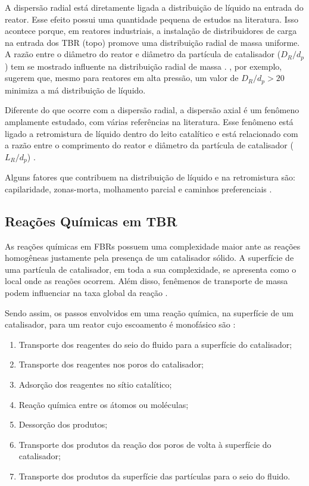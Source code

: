 A dispersão radial está diretamente ligada a distribuição de líquido na entrada
do reator. Esse efeito possui uma quantidade pequena de estudos na literatura.
Isso acontece porque, em reatores industriais, a instalação de distribuidores de
carga na entrada dos TBR (topo) promove uma distribuição radial de massa
uniforme. A razão entre o diâmetro do reator e diâmetro da partícula de
catalisador ($D_R/d_p$) tem se mostrado influente na distribuição radial de
massa \cite{Saroha1998}. , por exemplo, sugerem que,
mesmo para reatores em alta pressão, um valor de $D_R/d_p > 20$ minimiza a má
distribuição de líquido.

Diferente do que ocorre com a dispersão radial, a dispersão axial é um fenômeno
amplamente estudado, com várias referências na literatura. Esse fenômeno está
ligado a retromistura de líquido dentro do leito catalítico e está relacionado
com a razão entre o comprimento do reator e diâmetro da partícula de catalisador
($L_R/d_p$) \cite{Ancheyta2011}.


Alguns fatores que contribuem na distribuição de líquido e na retromistura são:
capilaridade, zonas-morta, molhamento parcial e caminhos preferenciais
\cite{Ranade2011}.

\subsection{Reações Químicas em TBR} \label{sec:reacoestbr}
 
As reações químicas em FBRs possuem uma complexidade maior ante as reações
homogêneas justamente pela presença de um catalisador sólido. A superfície
de uma partícula de catalisador, em toda a sua complexidade, se apresenta
como o local onde as reações ocorrem. Além disso, fenêmenos de transporte
de massa podem influenciar na taxa global da reação \cite{Froment2011}. 

Sendo assim, os passos envolvidos em uma reação química, na superfície de um
catalisador, para um reator cujo escoamento é monofásico são \cite{Froment2011}: 

\begin{enumerate}
\item Transporte dos reagentes do seio do fluido para a superfície
do catalisador;
\item Transporte dos reagentes nos poros do catalisador;
\item Adsorção dos reagentes no sítio catalítico;
\item Reação química entre os átomos ou moléculas;
\item Dessorção dos produtos;
\item Transporte dos produtos da reação dos poros de volta à
superfície do catalisador;
\item Transporte dos produtos da superfície das partículas para o seio do
fluido.
\end{enumerate} 

